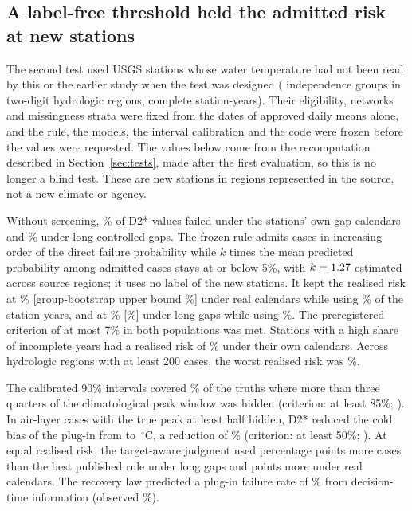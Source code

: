 \subsection{A label-free threshold held the admitted risk at new stations}
The second test used \TNewStations{} USGS stations whose water temperature had not been read by this or the earlier study when the test was designed (\TNewGroups{} independence groups in \TNewHucs{} two-digit hydrologic regions, \TNewYears{} complete station-years). Their eligibility, networks and missingness strata were fixed from the dates of approved daily means alone, and the rule, the models, the interval calibration and the code were frozen before the values were requested. The values below come from the recomputation described in Section~\ref{sec:tests}, made after the first evaluation, so this is no longer a blind test. These are new stations in regions represented in the source, not a new climate or agency.

Without screening, \TNewUnscreenedDeploy\% of D2* values failed under the stations' own gap calendars and \TNewUnscreenedMech\% under long controlled gaps. The frozen rule admits cases in increasing order of the direct failure probability while $k$ times the mean predicted probability among admitted cases stays at or below 5\%, with $k=1.27$ estimated across source regions; it uses no label of the new stations. It kept the realised risk at \TNewRiskDeploy\% [group-bootstrap upper bound \TNewRiskDeployHigh\%] under real calendars while using \TNewRetDeploy\% of the station-years, and at \TNewRiskMech\% [\TNewRiskMechHigh\%] under long gaps while using \TNewRetMech\%. The preregistered criterion of at most 7\% in both populations was met. Stations with a high share of incomplete years had a realised risk of \TNewRiskDeployHighMissing\% under their own calendars. Across hydrologic regions with at least 200 cases, the worst realised risk was \TNewWorstRegionRisk\%.

The calibrated 90\% intervals covered \TNewHardCoverage\% of the truths where more than three quarters of the climatological peak window was hidden (criterion: at least 85\%; \TNewHardCoverageVerdict). In air-layer cases with the true peak at least half hidden, D2* reduced the cold bias of the plug-in from \TNewPOneBiasPZero{} to \TNewPOneBiasDTwo\,$^{\circ}$C, a reduction of \TNewPOneReduction\% (criterion: at least 50\%; \TNewPOneVerdict). At equal realised risk, the target-aware judgment used \TNewGainMech{} percentage points more cases than the best published rule under long gaps and \TNewGainDeploy{} points more under real calendars. The recovery law predicted a plug-in failure rate of \TNewLawPredicted\% from decision-time information (observed \TNewObservedFail\%).
